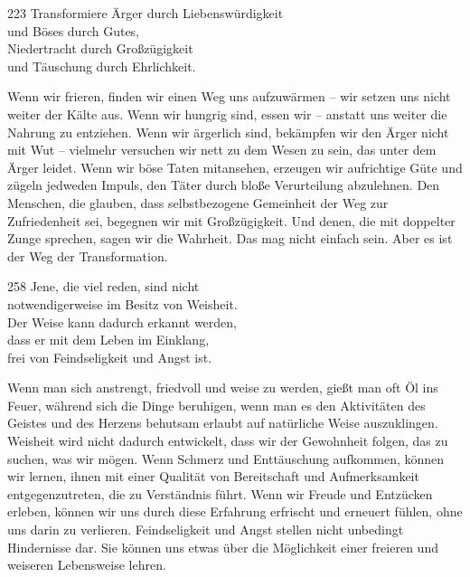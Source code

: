 
\begin{dhpVerse}{223}
\label{dhp-223}
Transformiere Ärger durch Liebenswürdigkeit\\ 
und Böses durch Gutes,\\ 
Niedertracht durch Großzügigkeit\\ 
und Täuschung durch Ehrlichkeit.
\end{dhpVerse}

\begin{dhpRefl}

Wenn wir frieren, finden wir einen Weg uns aufzuwärmen -- wir setzen uns nicht
weiter der Kälte aus. Wenn wir hungrig sind, essen wir -- anstatt uns weiter
die Nahrung zu entziehen. Wenn wir ärgerlich sind, bekämpfen wir den Ärger
nicht mit Wut -- vielmehr versuchen wir nett zu dem Wesen zu sein, das unter
dem Ärger leidet. Wenn wir böse Taten mitansehen, erzeugen wir aufrichtige
Güte und zügeln jedweden Impuls, den Täter durch bloße Verurteilung
abzulehnen. Den Menschen, die glauben, dass selbstbezogene Gemeinheit der Weg
zur Zufriedenheit sei, begegnen wir mit Großzügigkeit. Und denen, die mit
doppelter Zunge sprechen, sagen wir die Wahrheit. Das mag nicht einfach sein.
Aber es ist der Weg der Transformation.

\end{dhpRefl}


\begin{dhpVerse}{258}
\label{dhp-258}
Jene, die viel reden, sind nicht\\
notwendigerweise im Besitz von Weisheit.\\
Der Weise kann dadurch erkannt werden,\\
dass er mit dem Leben im Einklang,\\
frei von Feindseligkeit und Angst ist.
\end{dhpVerse}

\begin{dhpRefl}

Wenn man sich anstrengt, friedvoll und weise zu werden, gießt man oft Öl ins
Feuer, während sich die Dinge beruhigen, wenn man es den Aktivitäten des
Geistes und des Herzens behutsam erlaubt auf natürliche Weise auszuklingen.
Weisheit wird nicht dadurch entwickelt, dass wir der Gewohnheit folgen, das zu
suchen, was wir mögen. Wenn Schmerz und Enttäuschung aufkommen, können wir
lernen, ihnen mit einer Qualität von Bereitschaft und Aufmerksamkeit
entgegenzutreten, die zu Verständnis führt. Wenn wir Freude und Entzücken
erleben, können wir uns durch diese Erfahrung erfrischt und erneuert fühlen,
ohne uns darin zu verlieren. Feindseligkeit und Angst stellen nicht unbedingt
Hindernisse dar. Sie können uns etwas über die Möglichkeit einer freieren und
weiseren Lebensweise lehren.

\end{dhpRefl}

